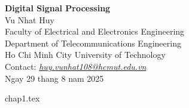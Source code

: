 \documentclass[11pt, a4paper]{article}
\begin{document}
\begin{titlepage}
    \centering
    \vspace*{1in}

    {\LARGE \bfseries Digital Signal Processing}\\[1.5cm]

    {\large Vu Nhat Huy}\\[0.5cm]
    {\large Faculty of Electrical and Electronics Engineering}\\
    {\large Department of Telecommunications Engineering}\\
    {\large Ho Chi Minh City University of Technology}\\
    {\large Contact: \href{mailto:huy.vunhat108@hcmut.edu.vn}{\it huy.vunhat108@hcmut.edu.vn}}\\[2cm]

    {\large Ngay 29 thang 8 nam 2025}

    \vfill
\end{titlepage}
{
  \tableofcontents
  \thispagestyle{empty}
}
\newpage
\setcounter{page}{1}
{chap1.tex}
\newpage
\end{document}
